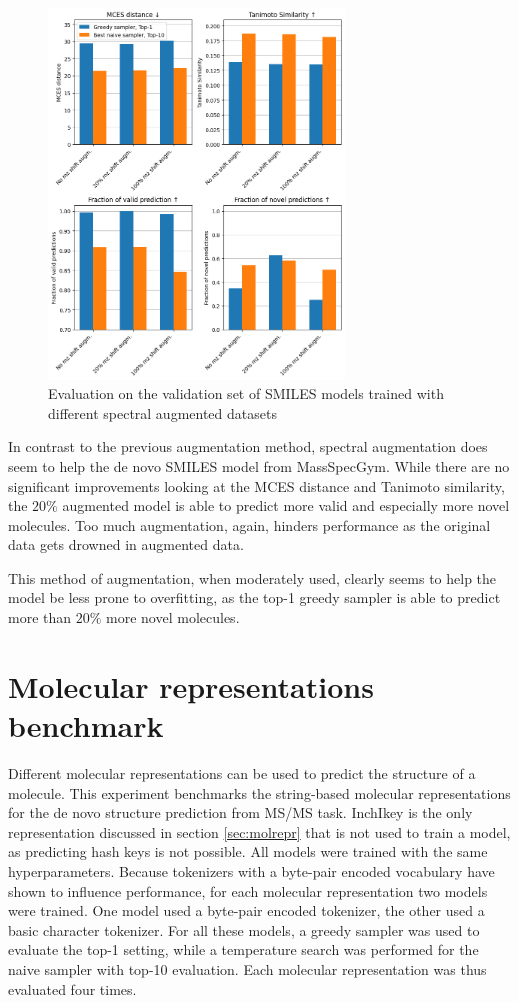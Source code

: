 \begin{figure}[h]
    \centering
    \includegraphics[width=0.7\textwidth]{figures/results/spectrum_augmentation_with_tanimoto.png}
    \caption{Evaluation on the validation set of SMILES models trained with different spectral augmented datasets}
    \label{fig:spectral_augm}
\end{figure}

In contrast to the previous augmentation method, spectral augmentation does seem to help the de novo SMILES model from MassSpecGym.
While there are no significant improvements looking at the MCES distance and Tanimoto similarity, the $20\%$ augmented model is able to predict more valid and especially more novel molecules.
Too much augmentation, again, hinders performance as the original data gets drowned in augmented data.

This method of augmentation, when moderately used, clearly seems to help the model be less prone to overfitting, as the top-1 greedy sampler is able to predict more than $20\%$ more novel molecules. 

\section{Molecular representations benchmark}

Different molecular representations can be used to predict the structure of a molecule.
This experiment benchmarks the string-based molecular representations for the de novo structure prediction from \ac{MS/MS} task.
InchIkey is the only representation discussed in section \ref{sec:molrepr} that is not used to train a model, as predicting hash keys is not possible.
All models were trained with the same hyperparameters.
Because tokenizers with a byte-pair encoded vocabulary have shown to influence performance, for each molecular representation two models were trained.
One model used a byte-pair encoded tokenizer, the other used a basic character tokenizer.
For all these models, a greedy sampler was used to evaluate the top-1 setting, while a temperature search was performed for the naive sampler with top-10 evaluation.
Each molecular representation was thus evaluated four times.

